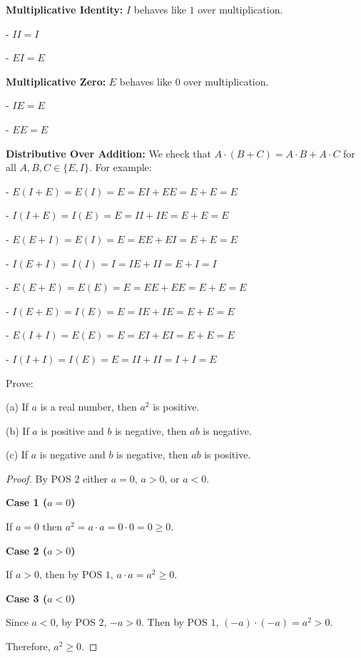 \documentclass[6pt]{article}
\begin{document}
\textbf{Multiplicative Identity:} $I$ behaves like $1$ over multiplication.

- $II = I$

- $EI = E$

\textbf{Multiplicative Zero:} $E$ behaves like $0$ over multiplication.

- $IE = E$

- $EE = E$

\textbf{Distributive Over Addition:} We check that $A \cdot (B + C) = A \cdot B + A \cdot C$ for all $A, B, C \in \{E, I\}$. For example:

- $E(I + E) = E(I) = E = EI + EE = E + E = E$

- $I(I + E) = I(E) = E = II + IE = E + E = E$

- $E(E + I) = E(I) = E = EE + EI = E + E = E$

- $I(E + I) = I(I) = I = IE + II = E + I = I$

- $E(E + E) = E(E) = E = EE + EE = E + E = E$

- $I(E + E) = I(E) = E = IE + IE = E + E = E$

- $E(I + I) = E(E) = E = EI + EI = E + E = E$

- $I(I + I) = I(E) = E = II + II = I + I = E$

\begin{tcolorbox}[title=Problem 1, breakable]
    Prove:

    (a) If $a$ is a real number, then $a^2$ is positive.

    (b) If $a$ is positive and $b$ is negative, then $ab$ is negative.

    (c) If $a$ is negative and $b$ is negative, then $ab$ is positive.
\end{tcolorbox}

\begin{proof}
    By POS $2$ either $a = 0$, $a > 0$, or $a < 0$.

    \textbf{Case 1 ($a = 0$)}

    If $a = 0$ then $a^2 = a \cdot a = 0 \cdot 0  = 0 \ge 0$.

    \textbf{Case 2 ($a > 0$)}

    If $a > 0$, then by POS $1$, $a \cdot a = a^2 \ge 0$.

    \textbf{Case 3 ($a < 0$)}

    Since $a < 0$, by POS $2$, $-a > 0$.
    Then by POS $1$, $(-a) \cdot (-a) = a^2 > 0$.

    Therefore, $a^2 \ge 0$.
\end{proof}
\end{document}

